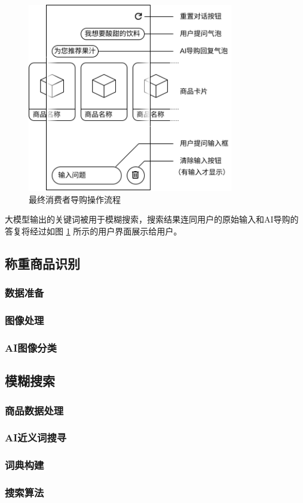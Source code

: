 \begin{figure}[htbp]
	\centering
	\includegraphics[width=0.8\textwidth, height=0.3\textheight, keepaspectratio]{./imgs/se-assist.png}
	\caption{最终消费者导购操作流程}
	\label{fig:se-assist}
\end{figure}

大模型输出的关键词被用于模糊搜索，搜索结果连同用户的原始输入和AI导购的答复将经过如图 \ref{fig:se-assist} 所示的用户界面展示给用户。

\subsection{称重商品识别}

\subsubsection{数据准备}

\subsubsection{图像处理}

\subsubsection{AI图像分类}

\subsection{模糊搜索}

\subsubsection{商品数据处理}

\subsubsection{AI近义词搜寻}

\subsubsection{词典构建}

\subsubsection{搜索算法}